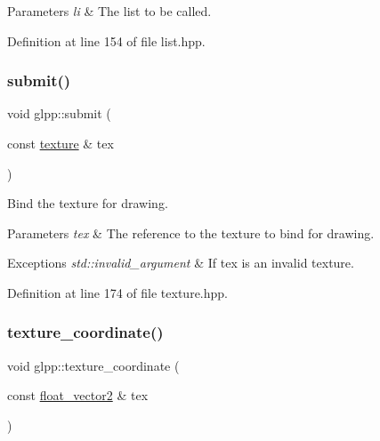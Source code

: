 \begin{DoxyParams}{Parameters}
{\em li} & The list to be called. \\
\hline
\end{DoxyParams}


Definition at line 154 of file list.\+hpp.

\mbox{\label{namespaceglpp_a0f22518667f7fad612bc6cf731c83580}} 
\subsubsection{\texorpdfstring{submit()}{submit()}\hspace{0.1cm}{\footnotesize\ttfamily [4/4]}}
{\footnotesize\ttfamily void glpp\+::submit (\begin{DoxyParamCaption}\item[{const \hyperlink{classglpp_1_1texture}{texture} \&}]{tex }\end{DoxyParamCaption})\hspace{0.3cm}{\ttfamily [inline]}}



Bind the texture for drawing. 


\begin{DoxyParams}{Parameters}
{\em tex} & The reference to the texture to bind for drawing. \\
\hline
\end{DoxyParams}

\begin{DoxyExceptions}{Exceptions}
{\em std\+::invalid\+\_\+argument} & If {\ttfamily tex} is an invalid texture. \\
\hline
\end{DoxyExceptions}


Definition at line 174 of file texture.\+hpp.

\mbox{\label{namespaceglpp_afa497f581263758c5e194771502a15b9}} 
\subsubsection{\texorpdfstring{texture\+\_\+coordinate()}{texture\_coordinate()}\hspace{0.1cm}{\footnotesize\ttfamily [1/8]}}
{\footnotesize\ttfamily void glpp\+::texture\+\_\+coordinate (\begin{DoxyParamCaption}\item[{const \hyperlink{namespaceglpp_ace2f7da7495fc7d1623d97a444c87146}{float\+\_\+vector2} \&}]{tex }\end{DoxyParamCaption})\hspace{0.3cm}{\ttfamily [noexcept]}}



